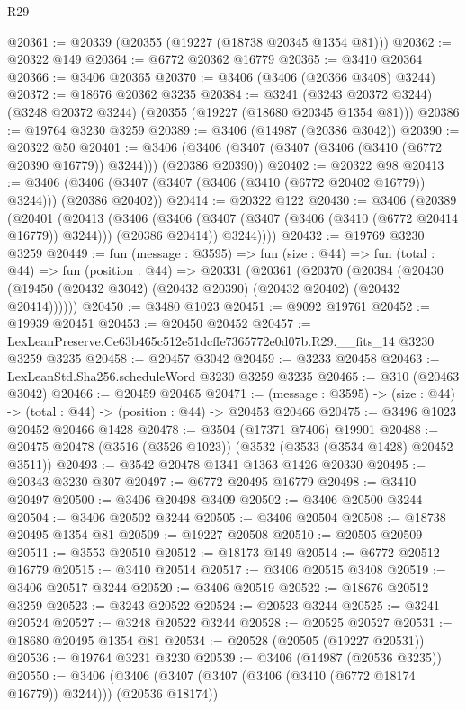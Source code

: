 \begin{lexlean}{R29}
\begin{coremodule}
@20361 := @20339 (@20355 (@19227 (@18738 @20345 @1354 @81)))
@20362 := @20322 @149
@20364 := @6772 @20362 @16779
@20365 := @3410 @20364
@20366 := @3406 @20365
@20370 := @3406 (@3406 (@20366 @3408) @3244)
@20372 := @18676 @20362 @3235
@20384 := @3241
    (@3243 @20372 @3244)
    (@3248 @20372 @3244)
    (@20355 (@19227 (@18680 @20345 @1354 @81)))
@20386 := @19764 @3230 @3259
@20389 := @3406 (@14987 (@20386 @3042))
@20390 := @20322 @50
@20401 := @3406 (@3406 (@3407 (@3407 (@3406 (@3410 (@6772 @20390 @16779)) @3244))) (@20386 @20390))
@20402 := @20322 @98
@20413 := @3406 (@3406 (@3407 (@3407 (@3406 (@3410 (@6772 @20402 @16779)) @3244))) (@20386 @20402))
@20414 := @20322 @122
@20430 := @3406
    (@20389
      (@20401
        (@20413
          (@3406
            (@3406 (@3407 (@3407 (@3406 (@3410 (@6772 @20414 @16779)) @3244))) (@20386 @20414))
            @3244))))
@20432 := @19769 @3230 @3259
@20449 := fun (message : @3595) =>
  fun (size : @44) =>
  fun (total : @44) =>
  fun (position : @44) =>
  @20331
    (@20361
      (@20370
        (@20384 (@20430 (@19450 (@20432 @3042) (@20432 @20390) (@20432 @20402) (@20432 @20414))))))
@20450 := @3480 @1023
@20451 := @9092 @19761
@20452 := @19939 @20451
@20453 := @20450 @20452
@20457 := LexLeanPreserve.Ce63b465c512e51dcffe7365772e0d07b.R29.__fits_14 @3230 @3259 @3235
@20458 := @20457 @3042
@20459 := @3233 @20458
@20463 := LexLeanStd.Sha256.scheduleWord @3230 @3259 @3235
@20465 := @310 (@20463 @3042)
@20466 := @20459 @20465
@20471 := (message : @3595) -> (size : @44) -> (total : @44) -> (position : @44) -> @20453 @20466
@20475 := @3496 @1023 @20452 @20466 @1428
@20478 := @3504 (@17371 @7406) @19901
@20488 := @20475 @20478 (@3516 (@3526 @1023)) (@3532 (@3533 (@3534 @1428) @20452 @3511))
@20493 := @3542 @20478 @1341 @1363 @1426 @20330
@20495 := @20343 @3230 @307
@20497 := @6772 @20495 @16779
@20498 := @3410 @20497
@20500 := @3406 @20498 @3409
@20502 := @3406 @20500 @3244
@20504 := @3406 @20502 @3244
@20505 := @3406 @20504
@20508 := @18738 @20495 @1354 @81
@20509 := @19227 @20508
@20510 := @20505 @20509
@20511 := @3553 @20510
@20512 := @18173 @149
@20514 := @6772 @20512 @16779
@20515 := @3410 @20514
@20517 := @3406 @20515 @3408
@20519 := @3406 @20517 @3244
@20520 := @3406 @20519
@20522 := @18676 @20512 @3259
@20523 := @3243 @20522
@20524 := @20523 @3244
@20525 := @3241 @20524
@20527 := @3248 @20522 @3244
@20528 := @20525 @20527
@20531 := @18680 @20495 @1354 @81
@20534 := @20528 (@20505 (@19227 @20531))
@20536 := @19764 @3231 @3230
@20539 := @3406 (@14987 (@20536 @3235))
@20550 := @3406 (@3406 (@3407 (@3407 (@3406 (@3410 (@6772 @18174 @16779)) @3244))) (@20536 @18174))

\end{coremodule}
\end{lexlean}
